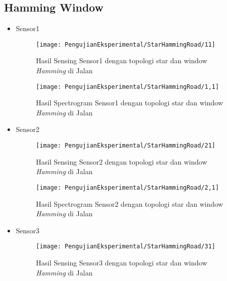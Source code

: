 \subsection{Hamming Window}
\begin{itemize}
\item Sensor1
\begin{figure}[H]
	\centering
	\texttt{[image: PengujianEksperimental/StarHammingRoad/11]}
	\caption[Hasil Sensing Sensor1 dengan topologi star dan window {\it Hamming} di Jalan]{Hasil Sensing Sensor1 dengan topologi star dan window {\it Hamming} di Jalan} 
	\label{fig:hasilJalanStarHamm11}
\end{figure}

\begin{figure}[H]
	\centering
	\texttt{[image: PengujianEksperimental/StarHammingRoad/1,1]}
	\caption[Hasil Spectrogram Sensor1 dengan topologi star dan window {\it Hamming} di Jalan]{Hasil Spectrogram Sensor1 dengan topologi star dan window {\it Hamming} di Jalan} 
	\label{fig:hasilJalanStarHamm1,1}
\end{figure}

\item Sensor2
\begin{figure}[H]
	\centering
	\texttt{[image: PengujianEksperimental/StarHammingRoad/21]}
	\caption[Hasil Sensing Sensor2 dengan topologi star dan window {\it Hamming} di Jalan]{Hasil Sensing Sensor2 dengan topologi star dan window {\it Hamming} di Jalan} 
	\label{fig:hasilJalanStarHamm21}
\end{figure}

\begin{figure}[H]
	\centering
	\texttt{[image: PengujianEksperimental/StarHammingRoad/2,1]}
	\caption[Hasil Spectrogram Sensor2 dengan topologi star dan window {\it Hamming} di Jalan]{Hasil Spectrogram Sensor2 dengan topologi star dan window {\it Hamming} di Jalan} 
	\label{fig:hasilJalanStarHamm2,1}
\end{figure}

\item Sensor3
\begin{figure}[H]
	\centering
	\texttt{[image: PengujianEksperimental/StarHammingRoad/31]}
	\caption[Hasil Sensing Sensor3 dengan topologi star dan window {\it Hamming} di Jalan]{Hasil Sensing Sensor3 dengan topologi star dan window {\it Hamming} di Jalan} 
	\label{fig:hasilJalanStarHamm31}
\end{figure}


\end{itemize}
